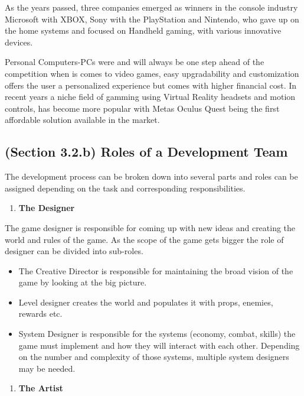 \documentclass[a4paper,one side,12pt]{book}
\begin{document}
As the years passed, three companies emerged as winners in the console
industry Microsoft with XBOX, Sony with the PlayStation and Nintendo,
who gave up on the home systems and focused on Handheld gaming, with
various innovative devices.

Personal Computers-PCs were and will always be one step ahead of the
competition when is comes to video games, easy upgradability and
customization offers the user a personalized experience but comes with
higher financial cost. In recent years a niche field of gamming using
Virtual Reality headsets and motion controls, has become more popular
with Meta\textquotesingle s Oculus Quest being the first affordable
solution available in the market.

\subsection{(Section 3.2.b) Roles of a Development Team}

The development process can be broken down into several parts and roles
can be assigned depending on the task and corresponding
responsibilities.

\begin{enumerate}
\def\labelenumi{\arabic{enumi}.}
\item
  \textbf{The Designer}
\end{enumerate}

The game designer is responsible for coming up with new ideas and
creating the world and rules of the game. As the scope of the game gets
bigger the role of designer can be divided into sub-roles.

\begin{itemize}
\item
  The Creative Director is responsible for maintaining the broad vision
  of the game by looking at the big picture.
\item
  Level designer creates the world and populates it with props, enemies,
  rewards etc.
\item
  System Designer is responsible for the systems (economy, combat,
  skills) the game must implement and how they will interact with each
  other. Depending on the number and complexity of those systems,
  multiple system designers may be needed.
\end{itemize}

\begin{enumerate}
\def\labelenumi{\arabic{enumi}.}
\setcounter{enumi}{1}
\item
  \textbf{The Artist}
\end{enumerate}
\end{document}
